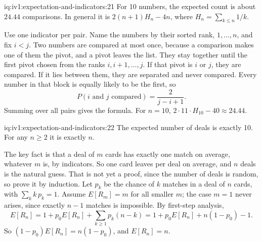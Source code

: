 \begin{solution}{iq:iv1:expectation-and-indicators:21}
For 10 numbers, the expected count is about $24.44$ comparisons. In general it is $2(n+1)H_n - 4n$, where $H_n = \sum_{k \le n} 1/k$.

Use one indicator per pair. Name the numbers by their sorted rank, $1, \dots, n$, and fix $i < j$. Two numbers are compared at most once, because a comparison makes one of them the pivot, and a pivot
leaves the list. They stay together until the first pivot chosen from the ranks $i, i+1, \dots, j$. If that pivot is $i$ or $j$, they are compared. If it lies between them, they are separated and never
compared. Every number in that block is equally likely to be the first, so
\[
P(i \text{ and } j \text{ compared}) = \frac{2}{j - i + 1}.
\]
Summing over all pairs gives the formula. For $n = 10$, $2 \cdot 11 \cdot H_{10} - 40 \approx 24.44$.

\end{solution}

\begin{solution}{iq:iv1:expectation-and-indicators:22}
The expected number of deals is exactly 10. For any $n \ge 2$ it is exactly $n$.

The key fact is that a deal of $m$ cards has exactly one match on average, whatever $m$ is, by indicators. So one card leaves per deal on average, and $n$ deals is the natural guess. That is not yet a proof, since the number of deals is random, so prove it by
induction. Let $p_k$ be the chance of $k$ matches in a deal of $n$ cards, with $\sum_k k\,p_k = 1$. Assume $E[R_m] = m$ for all smaller $m$; the case $m = 1$ never arises, since exactly $n - 1$ matches is impossible. By first-step analysis,
\[
E[R_n] = 1 + p_0 E[R_n] + \sum_{k \ge 1} p_k (n - k) = 1 + p_0 E[R_n] + n(1 - p_0) - 1.
\]
So $(1 - p_0)E[R_n] = n(1 - p_0)$, and $E[R_n] = n$.

\end{solution}

